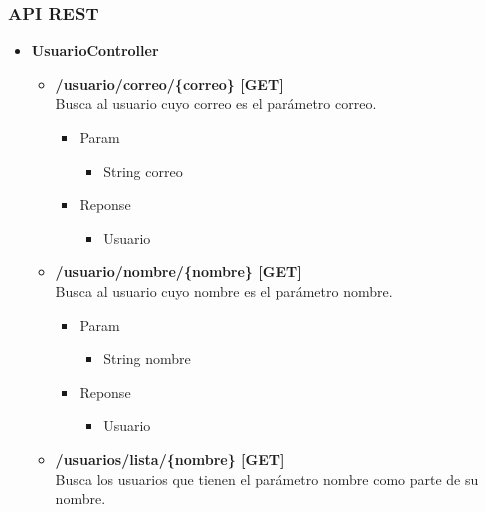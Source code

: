 \subsubsection{API REST}




\begin{itemize}
\item \textbf{UsuarioController}


\begin{itemize}
\item \textbf{ /usuario/correo/\{correo\} [GET]}\\
Busca al usuario cuyo correo es el parámetro correo.

\begin{itemize}
\item Param 
\begin{itemize}
\item String correo
\end{itemize}
\item Reponse
\begin{itemize}
\item Usuario
\end{itemize}
\end{itemize}
\end{itemize}






\begin{itemize}
\item  \textbf{/usuario/nombre/\{nombre\} [GET]}\\
Busca al usuario cuyo nombre es el parámetro nombre.
\begin{itemize}
\item Param
\begin{itemize}
\item String nombre
\end{itemize}
\item Reponse
\begin{itemize}
\item Usuario
\end{itemize}
\end{itemize}
\end{itemize}


\begin{itemize}
\item \textbf{ /usuarios/lista/\{nombre\} [GET]}\\
Busca los usuarios que tienen el parámetro nombre como  parte de su nombre.


\end{itemize}
\end{itemize}
